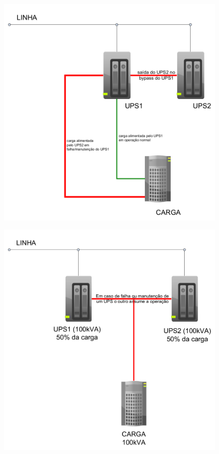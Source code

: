\begin{enumerate}
	\begin{figure}[H]
		\centering
		\begin{minipage}{0.45\textwidth}
			\centering
			\includegraphics[width=\textwidth]{Figures/7. nobreak/redundancia1.png}
			\label{fig: redundancia1}
		\end{minipage}
		\hfill
		\begin{minipage}{0.45\textwidth}
			\centering
			\includegraphics[width=\textwidth]{Figures/7. nobreak/redundancia2.png}

\end{minipage}
\end{figure}
\end{enumerate}
